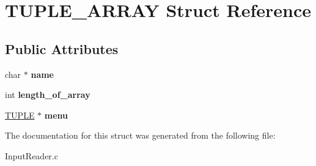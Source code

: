 \hypertarget{struct_t_u_p_l_e___a_r_r_a_y}{}\section{T\+U\+P\+L\+E\+\_\+\+A\+R\+R\+A\+Y Struct Reference}
\label{struct_t_u_p_l_e___a_r_r_a_y}
\subsection*{Public Attributes}
\begin{DoxyCompactItemize}
\item 
\hypertarget{struct_t_u_p_l_e___a_r_r_a_y_a20d5b03130ec4f995118d3f59ac584a4}{}char $\ast$ {\bfseries name}\label{struct_t_u_p_l_e___a_r_r_a_y_a20d5b03130ec4f995118d3f59ac584a4}

\item 
\hypertarget{struct_t_u_p_l_e___a_r_r_a_y_a65e38d59e3836d73407fa2b8f2f14d37}{}int {\bfseries length\+\_\+of\+\_\+array}\label{struct_t_u_p_l_e___a_r_r_a_y_a65e38d59e3836d73407fa2b8f2f14d37}

\item 
\hypertarget{struct_t_u_p_l_e___a_r_r_a_y_a0641b2de8fd49bd1b4a0c119e5444871}{}\hyperlink{struct_t_u_p_l_e}{T\+U\+P\+L\+E} $\ast$ {\bfseries menu}\label{struct_t_u_p_l_e___a_r_r_a_y_a0641b2de8fd49bd1b4a0c119e5444871}

\end{DoxyCompactItemize}


The documentation for this struct was generated from the following file\+:\begin{DoxyCompactItemize}
\item 
Input\+Reader.\+c\end{DoxyCompactItemize}
